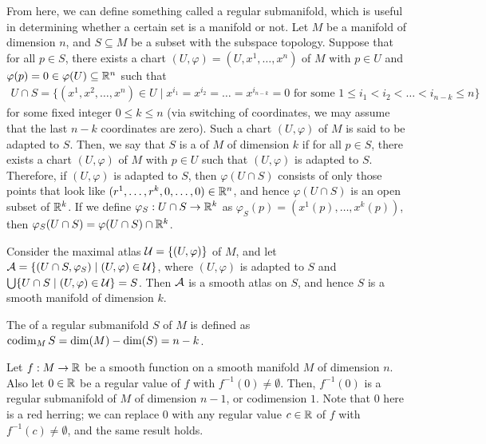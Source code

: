 From here, we can define something called a regular submanifold, which is useful in determining whether a certain set is a manifold or not. Let $M$ be a manifold of dimension $n$, and $S \subseteq M$ be a subset with the subspace topology. Suppose that for all $p \in S$, there exists a chart $(U,\varphi) = (U,x^{1},\ldots,x^{n})$ of $M$ with $p \in U$ and $\varphi(p) = 0 \in \varphi(U) \subseteq \mathbb{R}^{n}$ such that
\begin{align}
    U \cap S = \{(x^{1},x^{2},\ldots,x^{n}) \in U \mid x^{i_{1}} = x^{i_{2}} = \ldots = x^{i_{n-k}} = 0 \text{ for some } 1 \leq i_{1} < i_{2} < \ldots < i_{n-k} \leq n\}
\end{align}
for some fixed integer $0 \leq k \leq n$ (via switching of coordinates, we may assume that the last $n-k$ coordinates are zero). Such a chart $(U,\varphi)$ of $M$ is said to be adapted to $S$. Then, we say that $S$ is a  of $M$ of dimension $k$ if for all $p \in S$, there exists a chart $(U,\varphi)$ of $M$ with $p \in U$ such that $(U,\varphi)$ is adapted to $S$. Therefore, if $(U,\varphi)$ is adapted to $S$, then $\varphi(U \cap S)$ consists of only those points that look like $(r^{1},\ldots,r^{k},0,\ldots,0) \in \mathbb{R}^{n}$, and hence $\varphi(U \cap S)$ is an open subset of $\mathbb{R}^{k}$. If we define $\varphi_{S}:U \cap S \to \mathbb{R}^{k}$ as $\varphi_{S}(p) = (x^{1}(p),\ldots,x^{k}(p))$, then $\varphi_{S}(U \cap S) = \varphi(U \cap S) \cap \mathbb{R}^{k}$.

\begin{theorem}
    Consider the maximal atlas $\mathcal{U} = \{(U,\varphi)\}$ of $M$, and let $\mathcal{A} = \{(U \cap S, \varphi_{S}) \mid (U,\varphi) \in \mathcal{U}\}$, where $(U,\varphi)$ is adapted to $S$ and $\bigcup \{U \cap S \mid (U,\varphi) \in \mathcal{U}\} = S$. Then $\mathcal{A}$ is a smooth atlas on $S$, and hence $S$ is a smooth manifold of dimension $k$.
\end{theorem}
The  of a regular submanifold $S$ of $M$ is defined as $\operatorname{codim}_{M}S = \dim(M) - \dim(S) = n-k$.

Let $f:M \to \mathbb{R}$ be a smooth function on a smooth manifold $M$ of dimension $n$. Also let $0 \in \mathbb{R}$ be a regular value of $f$ with $f^{-1}(0) \neq \emptyset$. Then, $f^{-1}(0)$ is a regular submanifold of $M$ of dimension $n-1$, or codimension $1$. Note that $0$ here is a red herring; we can replace $0$ with any regular value $c \in \mathbb{R}$ of $f$ with $f^{-1}(c) \neq \emptyset$, and the same result holds. 

